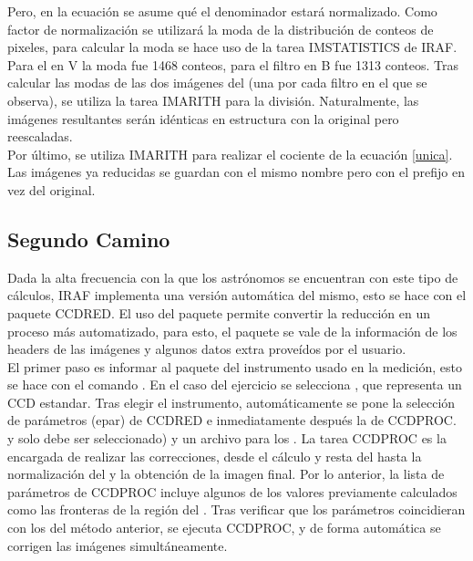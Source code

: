 \documentclass[12pt]{article}
\begin{document}
Pero, en la ecuación se asume qué el denominador estará normalizado. Como factor de normalización se utilizará la moda de la distribución de conteos de pixeles, para calcular la moda se hace uso de la tarea IMSTATISTICS de IRAF. Para el  en V la moda fue 1468 conteos, para el filtro en B fue 1313 conteos. Tras calcular las modas de las dos imágenes del  (una por cada filtro en el que se observa), se utiliza la tarea IMARITH para la división. Naturalmente, las imágenes resultantes serán idénticas en estructura con la original pero reescaladas.\\

Por último, se utiliza IMARITH para realizar el cociente de la ecuación \ref{unica}. Las imágenes ya reducidas se guardan con el mismo nombre pero con el prefijo  en vez del  original.

\subsection{Segundo Camino}
Dada la alta frecuencia con la que los astrónomos se encuentran con este tipo de cálculos, IRAF implementa una versión automática del mismo, esto se hace con el paquete CCDRED. El uso del paquete permite convertir la reducción en un proceso más automatizado, para esto, el paquete se vale de la información de los headers de las imágenes y algunos datos extra proveídos por el usuario.\\

El primer paso es informar al paquete del instrumento usado en la medición, esto se hace con el comando . En el caso del ejercicio se selecciona , que representa un CCD estandar. Tras elegir el instrumento, automáticamente se pone la selección de parámetros (epar) de CCDRED e inmediatamente después la de CCDPROC.  y solo debe ser seleccionado) y un archivo para los . La tarea CCDPROC es la encargada de realizar las correcciones, desde el cálculo y resta del  hasta la normalización del  y la obtención de la imagen final. Por lo anterior, la lista de parámetros de CCDPROC incluye algunos de los valores previamente calculados como las fronteras de la región del . Tras verificar que los parámetros coincidieran con los del método anterior, se ejecuta CCDPROC, y de forma automática se corrigen las imágenes simultáneamente. 
















{}

\end{document}
